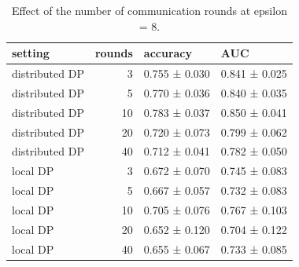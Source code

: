 \begin{table}
\caption{Effect of the number of communication rounds at epsilon = 8.}
\label{tab:T02_rounds_ablation}
\begin{tabular}{lrll}
\toprule
setting & rounds & accuracy & AUC \\
\midrule
distributed DP & 3 & 0.755 ± 0.030 & 0.841 ± 0.025 \\
distributed DP & 5 & 0.770 ± 0.036 & 0.840 ± 0.035 \\
distributed DP & 10 & 0.783 ± 0.037 & 0.850 ± 0.041 \\
distributed DP & 20 & 0.720 ± 0.073 & 0.799 ± 0.062 \\
distributed DP & 40 & 0.712 ± 0.041 & 0.782 ± 0.050 \\
local DP & 3 & 0.672 ± 0.070 & 0.745 ± 0.083 \\
local DP & 5 & 0.667 ± 0.057 & 0.732 ± 0.083 \\
local DP & 10 & 0.705 ± 0.076 & 0.767 ± 0.103 \\
local DP & 20 & 0.652 ± 0.120 & 0.704 ± 0.122 \\
local DP & 40 & 0.655 ± 0.067 & 0.733 ± 0.085 \\
\bottomrule
\end{tabular}
\end{table}
